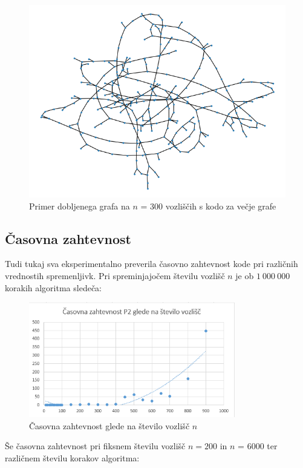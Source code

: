 \documentclass[a4paper, 12 pt]{article}
\begin{document}
\begin{figure}[H]
\centering
  \includegraphics[width=12cm]{drevo300diam202.png}
  \caption{Primer dobljenega grafa na $n$ = 300 vozliščih s kodo za večje grafe}
  \label{300_p2} 
\end{figure}

\subsection{Časovna zahtevnost}

Tudi tukaj sva eksperimentalno preverila časovno zahtevnost kode pri različnih vrednostih spremenljivk. Pri spreminjajočem številu vozlišč $n$ je ob $1 \ 000 \ 000$ korakih algoritma sledeča:

\begin{figure}[H]
\centering
  \includegraphics[width=9cm]{casovna_p2_n.png}
  \caption{Časovna zahtevnost glede na število vozlišč $n$}
  \label{fig:p2_časovna_zaht_n} 
\end{figure}

\pagebreak

Še časovna zahtevnost pri fiksnem številu vozlišč $n = 200$ in $n$ = 6000 ter različnem številu korakov algoritma:
\end{document}
